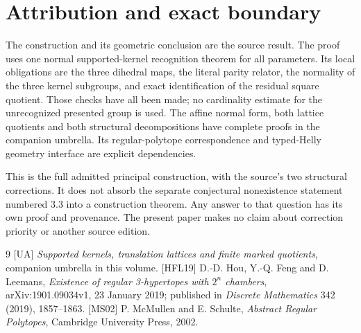 \section{Attribution and exact boundary}
The construction and its geometric conclusion are the source result.
The proof uses one normal supported-kernel recognition theorem for all
parameters. Its local obligations are the three dihedral maps, the literal
parity relator, the normality of the three kernel subgroups, and exact
identification of the residual square quotient. Those checks have all been
made; no cardinality estimate for the unrecognized presented group is used.
The affine normal form, both lattice quotients and both structural
decompositions have complete proofs in the companion umbrella. Its
regular-polytope correspondence and typed-Helly geometry interface are
explicit dependencies.

This is the full admitted principal construction, with the source's two
structural corrections. It does not absorb the separate conjectural
nonexistence statement numbered 3.3 into a construction theorem. Any answer
to that question has its own proof and provenance. The present paper makes
no claim about correction priority or another source edition.

\begin{thebibliography}{9}
[UA] \emph{Supported kernels, translation lattices and finite marked quotients},
companion umbrella in this volume.
[HFL19] D.-D. Hou, Y.-Q. Feng and D. Leemans,
\emph{Existence of regular 3-hypertopes with $2^n$ chambers},
arXiv:1901.09034v1, 23 January 2019; published in
\emph{Discrete Mathematics} 342 (2019), 1857--1863.
[MS02] P. McMullen and E. Schulte,
\emph{Abstract Regular Polytopes}, Cambridge University Press, 2002.
\end{thebibliography}

